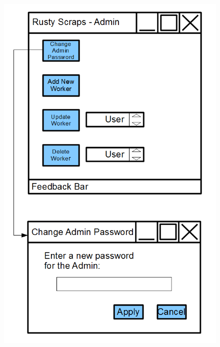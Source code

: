 \begin{figure}[H]
    \includegraphics[width=\textwidth]{./Design/Images/ChangePassword.png}
\end{figure}

